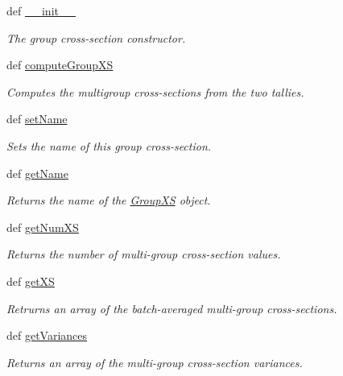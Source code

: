 \begin{DoxyCompactItemize}
\item 
def \hyperlink{classpinspec_1_1process_1_1GroupXS_ad81cb8d5201650c809f300a4af11921f}{\-\_\-\-\_\-init\-\_\-\-\_\-}
\begin{DoxyCompactList}\small\item\em The group cross-\/section constructor. \end{DoxyCompactList}\item 
def \hyperlink{classpinspec_1_1process_1_1GroupXS_a86e9d4738e35a82b241a3c7b79882466}{compute\-Group\-X\-S}
\begin{DoxyCompactList}\small\item\em Computes the multigroup cross-\/sections from the two tallies. \end{DoxyCompactList}\item 
def \hyperlink{classpinspec_1_1process_1_1GroupXS_ae52730b41f0003d4295486cba6ec7438}{set\-Name}
\begin{DoxyCompactList}\small\item\em Sets the name of this group cross-\/section. \end{DoxyCompactList}\item 
def \hyperlink{classpinspec_1_1process_1_1GroupXS_ad184b77037578e558a6698a8311bc284}{get\-Name}
\begin{DoxyCompactList}\small\item\em Returns the name of the \hyperlink{classpinspec_1_1process_1_1GroupXS}{Group\-X\-S} object. \end{DoxyCompactList}\item 
def \hyperlink{classpinspec_1_1process_1_1GroupXS_ae4ae5eda18c6bbc4151d95525ce37394}{get\-Num\-X\-S}
\begin{DoxyCompactList}\small\item\em Returns the number of multi-\/group cross-\/section values. \end{DoxyCompactList}\item 
def \hyperlink{classpinspec_1_1process_1_1GroupXS_a2722f0f4c1e6e7ffdcd3485052ba59b7}{get\-X\-S}
\begin{DoxyCompactList}\small\item\em Retrurns an array of the batch-\/averaged multi-\/group cross-\/sections. \end{DoxyCompactList}\item 
def \hyperlink{classpinspec_1_1process_1_1GroupXS_ac26ac7b80a4498b75fc535f112bf1ff4}{get\-Variances}
\begin{DoxyCompactList}\small\item\em Returns an array of the multi-\/group cross-\/section variances. \end{DoxyCompactList}\item 

\end{DoxyCompactItemize}
